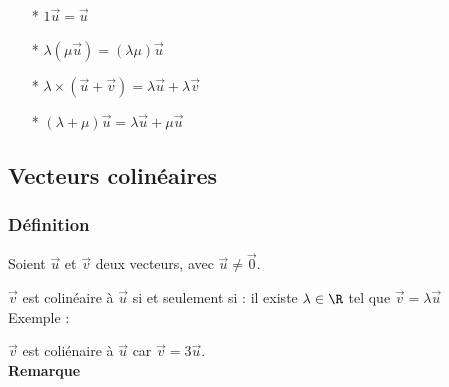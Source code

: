 \begin{itemize}
\item[*]$1\overrightarrow{u} = \overrightarrow{u}$
\item[*]$\lambda\left(\mu \overrightarrow{u} \right) = \left(\lambda\mu\right)\overrightarrow{u}$
\item[*] $\lambda \times \left( \overrightarrow{u} + \overrightarrow{v}\right) = \lambda \overrightarrow{u} + \lambda \overrightarrow{v}$
\item[*] $\left(\lambda + \mu \right) \overrightarrow{u} = \lambda \overrightarrow{u} + \mu \overrightarrow{u}$
\end{itemize}

\newpage 
\subsection{Vecteurs colinéaires}

\subsubsection{Définition}

Soient $\overrightarrow{u}$ et $\overrightarrow{v}$ deux vecteurs, avec $\overrightarrow{u} \neq \overrightarrow{0}$.

$\overrightarrow{v}$ est colinéaire à $\overrightarrow{u}$ si et seulement si : il existe $\lambda \in \R$ tel que $\overrightarrow{v} = \lambda\overrightarrow{u}$ \\

Exemple :


$\overrightarrow{v}$ est coliénaire à $\overrightarrow{u}$ car  $\overrightarrow{v} = 3 \overrightarrow{u}$. \\

\textbf{Remarque}

